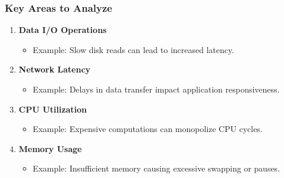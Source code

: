 \documentclass[aspectratio=169]{beamer}
\begin{document}
\begin{frame}[fragile]
    \frametitle{Key Areas to Analyze}
    \begin{enumerate}
        \item \textbf{Data I/O Operations}
            \begin{itemize}
                \item Example: Slow disk reads can lead to increased latency.
            \end{itemize}
        \item \textbf{Network Latency}
            \begin{itemize}
                \item Example: Delays in data transfer impact application responsiveness.
            \end{itemize}
        \item \textbf{CPU Utilization}
            \begin{itemize}
                \item Example: Expensive computations can monopolize CPU cycles.
            \end{itemize}
        \item \textbf{Memory Usage}
            \begin{itemize}
                \item Example: Insufficient memory causing excessive swapping or pauses.
            \end{itemize}
    \end{enumerate}
\end{frame}
\end{document}
